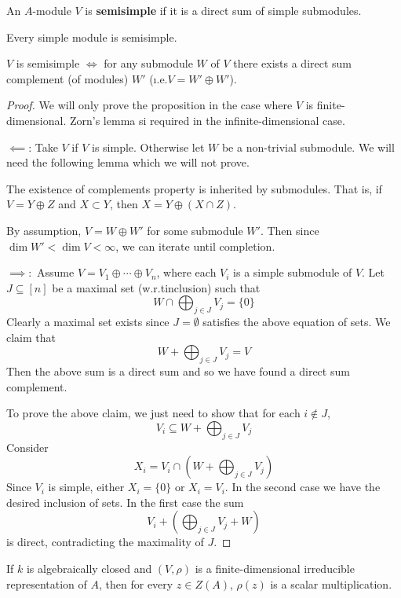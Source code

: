 \begin{defn}
	An $A$-module $V$ is \textbf{semisimple} if it is a direct sum of simple submodules.
\end{defn}

\begin{rmk}
	Every simple module is semisimple.
\end{rmk}

\begin{prop}
	$V$ is semisimple $\iff$ for any submodule $W$ of $V$ there exists a direct sum complement (of modules) $W'$ (\i.e.\@ $V = W' \oplus W'$).
\end{prop}

\begin{proof}
	We will only prove the proposition in the case where $V$ is finite-dimensional.
	Zorn's lemma si required in the infinite-dimensional case.
	
	$\impliedby$: Take $V$ if $V$ is simple.
	Otherwise let $W$ be a non-trivial submodule.
	We will need the following lemma which we will not prove.
	\begin{lem}
		The existence of complements property is inherited by submodules.
		That is, if $V = Y \oplus Z$ and $X \subset Y$, then $X = Y \oplus (X \cap Z)$.
	\end{lem}	
	By assumption, $V = W \oplus W'$ for some submodule $W'$.
	Then since $\dim W' < \dim V < \infty$, we can iterate until completion.
	
	$\implies:$
	Assume $V = V_1 \oplus \cdots \oplus V_n$, where each $V_i$ is a simple submodule of $V$.
	Let $J \subseteq [n]$ be a maximal set (w.r.t\@ inclusion) such that
	\[W \cap \bigoplus_{j \in J} V_j = \{0\}\]
	Clearly a maximal set exists since $J = \emptyset$ satisfies the above equation of sets.
	We claim that 
	\[W + \bigoplus_{j \in J} V_j = V\]
	Then the above sum is a direct sum and so we have found a direct sum complement.
	
	To prove the above claim, we just need to show that for each $i \notin J$,
	\[V_i \subseteq W + \bigoplus_{j \in J} V_j\]
	Consider
	\[X_i = V_i \cap \left( W + \bigoplus_{j \in J} V_j \right)\]
	Since $V_i$ is simple, either $X_i = \{0\}$ or $X_i = V_i$.
	In the second case we have the desired inclusion of sets.
	In the first case the sum
	\[V_i + \left( \bigoplus_{j \in J} V_j + W \right)\]
	is direct, contradicting the maximality of $J$.
\end{proof}

\begin{cor}\label{cor:schur}
	If $k$ is algebraically closed and $(V,\rho)$ is a finite-dimensional irreducible representation of $A$, then for every $z \in Z(A)$, $\rho(z)$ is a scalar multiplication.
\end{cor}

